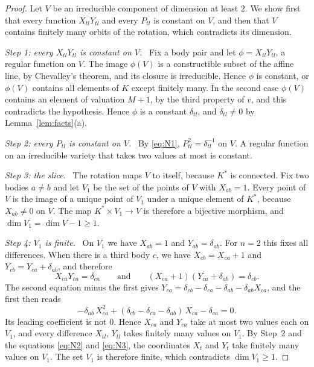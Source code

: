 \documentclass[11pt]{amsart}
\theoremstyle{definition}
\theoremstyle{remark}
\numberwithin{equation}{section}
\newcommand{\step}[1]{\smallskip\noindent\textit{#1}\ }
\begin{document}
\begin{proof}
Let $V$ be an irreducible component of dimension at least $2$. We show first that every function
$X_{tl} Y_{tl}$ and every $P_{tl}$ is constant on $V$, and then that $V$ contains finitely many orbits
of the rotation, which contradicts its dimension.

\step{Step 1: every $X_{tl} Y_{tl}$ is constant on $V$.} Fix a body pair and let $\phi = X_{tl} Y_{tl}$,
a regular function on $V$. The image $\phi(V)$ is a constructible subset of the affine line, by
Chevalley's theorem, and its closure is irreducible. Hence $\phi$ is constant, or $\phi(V)$ contains
all elements of $K$ except finitely many. In the second case $\phi(V)$ contains an element of valuation
$M + 1$, by the third property of $v$, and this contradicts the hypothesis. Hence $\phi$ is a constant
$\delta_{tl}$, and $\delta_{tl} \ne 0$ by Lemma~\ref{lem:facts}(a).

\step{Step 2: every $P_{tl}$ is constant on $V$.} By \eqref{eq:N1}, $P_{tl}^2 = \delta_{tl}^{-1}$ on
$V$. A regular function on an irreducible variety that takes two values at most is constant.

\step{Step 3: the slice.} The rotation maps $V$ to itself, because $K^{*}$ is connected. Fix two bodies
$a \ne b$ and let $V_1$ be the set of the points of $V$ with $X_{ab} = 1$. Every point of $V$ is the
image of a unique point of $V_1$ under a unique element of $K^{*}$, because $X_{ab} \ne 0$ on $V$.
The map $K^{*} \times V_1 \to V$ is therefore a bijective morphism, and $\dim V_1 = \dim V - 1 \ge 1$.

\step{Step 4: $V_1$ is finite.} On $V_1$ we have $X_{ab} = 1$ and $Y_{ab} = \delta_{ab}$. For $n = 2$
this fixes all differences. When there is a third body $c$, we have $X_{cb} = X_{ca} + 1$ and
$Y_{cb} = Y_{ca} + \delta_{ab}$, and therefore
\[
  X_{ca} Y_{ca} = \delta_{ca} \qquad\text{and}\qquad
  (X_{ca} + 1)(Y_{ca} + \delta_{ab}) = \delta_{cb} .
\]
The second equation minus the first gives
$Y_{ca} = \delta_{cb} - \delta_{ca} - \delta_{ab} - \delta_{ab} X_{ca}$, and the first then reads
\[
  -\delta_{ab}\, X_{ca}^2 + (\delta_{cb} - \delta_{ca} - \delta_{ab})\, X_{ca} - \delta_{ca} = 0 .
\]
Its leading coefficient is not $0$. Hence $X_{ca}$ and $Y_{ca}$ take at most two values each on $V_1$,
and every difference $X_{tl}$, $Y_{tl}$ takes finitely many values on $V_1$. By Step~2 and the equations
\eqref{eq:N2} and \eqref{eq:N3}, the coordinates $X_t$ and $Y_t$ take finitely many values on $V_1$.
The set $V_1$ is therefore finite, which contradicts $\dim V_1 \ge 1$.
\end{proof}
\end{document}
